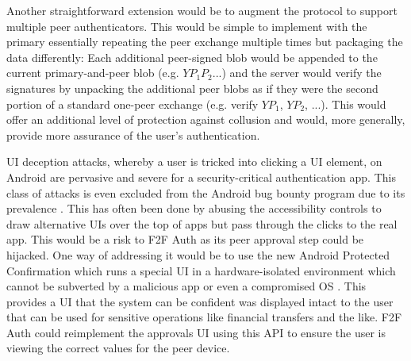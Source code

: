 \documentclass[letterpaper, 10 pt, conference]{ieeeconf}
\begin{document}
  Another straightforward extension would be to augment the protocol to support multiple peer authenticators.
  This would be simple to implement with the primary essentially repeating the peer exchange multiple times but packaging the data differently:
  Each additional peer-signed blob would be appended to the current primary-and-peer blob (e.g. $YP_1P_2...$) and the server would verify the signatures by unpacking the additional peer blobs as if they were the second portion of a standard one-peer exchange (e.g. verify $YP_1$, $YP_2$, $...$).
  This would offer an additional level of protection against collusion and would, more generally, provide more assurance of the user's authentication.
  
  UI deception attacks, whereby a user is tricked into clicking a UI element, on Android are pervasive and severe for a security-critical authentication app.
  This class of attacks is even excluded from the Android bug bounty program due to its prevalence \cite{androidvrp}.
  This has often been done by abusing the accessibility controls to draw alternative UIs over the top of apps but pass through the clicks to the real app.
  This would be a risk to F2F Auth as its peer approval step could be hijacked.
  One way of addressing it would be to use the new Android Protected Confirmation which runs a special UI in a hardware-isolated environment which cannot be subverted by a malicious app or even a compromised OS \cite{androidpc}.
  This provides a UI that the system can be confident was displayed intact to the user that can be used for sensitive operations like financial transfers and the like.
  F2F Auth could reimplement the approvals UI using this API to ensure the user is viewing the correct values for the peer device.

\addtolength{\textheight}{-12cm}   %


\end{document}
